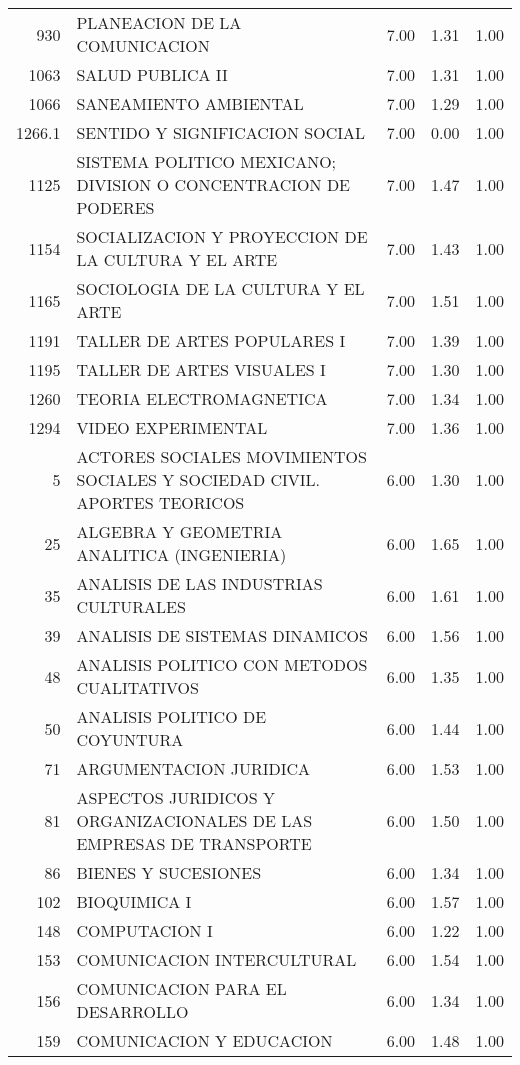 \begin{table}[ht]
\begin{tabular}{rlrrr}
  930 & PLANEACION DE LA COMUNICACION & 7.00 & 1.31 & 1.00 \\ 
  1063 & SALUD PUBLICA II & 7.00 & 1.31 & 1.00 \\ 
  1066 & SANEAMIENTO AMBIENTAL & 7.00 & 1.29 & 1.00 \\ 
  1266.1 & SENTIDO Y SIGNIFICACION SOCIAL & 7.00 & 0.00 & 1.00 \\ 
  1125 & SISTEMA POLITICO MEXICANO; DIVISION O CONCENTRACION DE PODERES & 7.00 & 1.47 & 1.00 \\ 
  1154 & SOCIALIZACION Y PROYECCION DE LA CULTURA Y EL ARTE & 7.00 & 1.43 & 1.00 \\ 
  1165 & SOCIOLOGIA DE LA CULTURA Y EL ARTE & 7.00 & 1.51 & 1.00 \\ 
  1191 & TALLER DE ARTES POPULARES I & 7.00 & 1.39 & 1.00 \\ 
  1195 & TALLER DE ARTES VISUALES I & 7.00 & 1.30 & 1.00 \\ 
  1260 & TEORIA ELECTROMAGNETICA & 7.00 & 1.34 & 1.00 \\ 
  1294 & VIDEO EXPERIMENTAL & 7.00 & 1.36 & 1.00 \\ 
  5 & ACTORES SOCIALES MOVIMIENTOS SOCIALES Y SOCIEDAD CIVIL. APORTES TEORICOS & 6.00 & 1.30 & 1.00 \\ 
  25 & ALGEBRA Y GEOMETRIA ANALITICA (INGENIERIA) & 6.00 & 1.65 & 1.00 \\ 
  35 & ANALISIS DE LAS INDUSTRIAS CULTURALES & 6.00 & 1.61 & 1.00 \\ 
  39 & ANALISIS DE SISTEMAS DINAMICOS & 6.00 & 1.56 & 1.00 \\ 
  48 & ANALISIS POLITICO CON METODOS CUALITATIVOS & 6.00 & 1.35 & 1.00 \\ 
  50 & ANALISIS POLITICO DE COYUNTURA & 6.00 & 1.44 & 1.00 \\ 
  71 & ARGUMENTACION JURIDICA & 6.00 & 1.53 & 1.00 \\ 
  81 & ASPECTOS JURIDICOS Y ORGANIZACIONALES DE LAS EMPRESAS DE TRANSPORTE & 6.00 & 1.50 & 1.00 \\ 
  86 & BIENES Y SUCESIONES & 6.00 & 1.34 & 1.00 \\ 
  102 & BIOQUIMICA I & 6.00 & 1.57 & 1.00 \\ 
  148 & COMPUTACION I & 6.00 & 1.22 & 1.00 \\ 
  153 & COMUNICACION INTERCULTURAL & 6.00 & 1.54 & 1.00 \\ 
  156 & COMUNICACION PARA EL DESARROLLO & 6.00 & 1.34 & 1.00 \\ 
  159 & COMUNICACION Y EDUCACION & 6.00 & 1.48 & 1.00 \\ 

\end{tabular}
\end{table}
